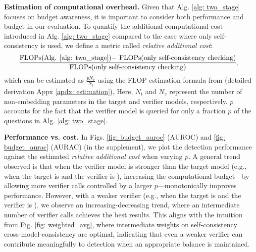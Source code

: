 \textbf{Estimation of computational overhead.} Given that Alg. \ref{alg: two_stage} focuses on budget awareness, it is important to consider both performance and budget in our evaluation. To quantify the additional computational cost introduced in Alg. \ref{alg: two_stage} compared to the case where only self-consistency is used, we define a metric called \emph{relative additional cost}:
$$
\frac{\text{FLOPs(Alg. \ref{alg: two_stage})$-$ FLOPs(only self-consistency checking)} }{\text{FLOPs(only self-consistency checking)}},
$$
which can be estimated as $ \frac{pN_{v}}{N_{t}}$ using the FLOP estimation formula from \cite{kaplan2020scaling} (detailed derivation Appx \ref{apdx: estimation}), Here, $N_{t}$ and $N_{v}$ represent the number of non-embedding parameters in the target and verifier models, respectively.  $p$ accounts for the fact that the verifier model is queried for only a fraction $p$ of the questions in Alg. \ref{alg: two_stage}. 




\textbf{Performance vs. cost.} In Figs. \ref{fig: budget_auroc} (AUROC) and \ref{fig: budget_aurac}  (AURAC) (in the supplement), we plot the detection performance against the estimated \emph{relative additional cost} when varying $p$. A general trend observed is that when the verifier model is stronger than the target model (e.g., when the target is \merlinite{} and the verifier is \llamathreeseventy{}), increasing the computational budget—by allowing more verifier calls controlled by a larger $p$—monotonically improves performance. However, with a weaker verifier (e.g., when the target is \llamathreeseventy{} and the verifier is \llamatwothirteen{}), we observe an increasing-decreasing trend, where an intermediate number of verifier calls achieves the best results. This aligns with the intuition from Fig. \ref{fig: weighted_avg}, where intermediate weights on self-consistency cross-model-consistency are optimal, indicating that even a weaker verifier can contribute meaningfully to detection when an appropriate balance is maintained.

